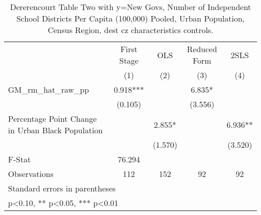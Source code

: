 \begin{table}[htbp]\centering
\def\sym#1{\ifmmode^{#1}\else\(^{#1}\)\fi}
\caption{Dererencourt Table Two with y=New Govs, Number of Independent School Districts Per Capita (100,000) Pooled, Urban Population, Census Region, dest cz characteristics controls.}
\begin{tabular}{l*{4}{c}}
\toprule
                    & First Stage   &         OLS   &Reduced Form   &        2SLS   \\
                    &\multicolumn{1}{c}{(1)}   &\multicolumn{1}{c}{(2)}   &\multicolumn{1}{c}{(3)}   &\multicolumn{1}{c}{(4)}   \\
\midrule
GM\_rm\_hat\_raw\_pp    &       0.918***&               &       6.835*  &               \\
                    &     (0.105)   &               &     (3.556)   &               \\
\addlinespace
Percentage Point Change in Urban Black Population&               &       2.855*  &               &       6.936** \\
                    &               &     (1.570)   &               &     (3.520)   \\
\midrule
F-Stat              &      76.294   &               &               &               \\
Observations        &         112   &         152   &          92   &          92   \\
\bottomrule
\multicolumn{5}{l}{\footnotesize Standard errors in parentheses}\\
\multicolumn{5}{l}{\footnotesize * p<0.10, ** p<0.05, *** p<0.01}\\
\end{tabular}
\end{table}
